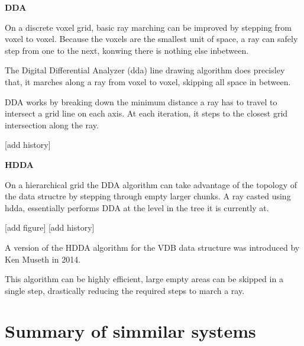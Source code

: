 \vspace{0.5cm}
\label{def:dda}
\textbf{DDA}

On a discrete voxel grid, basic ray marching can be improved by stepping from voxel to voxel. Because the voxels are the smallest unit of space, a ray can safely step from one to the next, konwing there is nothing else inbetween.

The Digital Differential Analyzer (\acrshort{dda}) line drawing algorithm does precisley that, it marches along a ray from voxel to voxel, skipping all space in between.

DDA works by breaking down the minimum distance a ray has to travel to intersect a grid line on each axis.
At each iteration, it steps to the closest grid intersection along the ray.

[add history]

\vspace{0.5cm}
\label{def:hdda}
\textbf{HDDA}

On a hierarchical grid the DDA algorithm can take advantage of the topology of the data structre by stepping through empty larger chunks.
A ray casted using \acrshort{hdda}, essentially performs DDA at the level in the tree it is currently at.

[add figure]
[add history]

A version of the HDDA algorithm for the VDB data structure was introduced by Ken Museth in 2014\supercite{vdb2014}.

This algorithm can be highly efficient, large empty areas can be skipped in a single step, drastically reducing the required steps to march a ray.

\section{Summary of simmilar systems}
